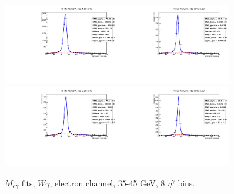 \begin{figure}[htb]
\begin{center}
   \includegraphics[width=0.45\textwidth]{../figs/figs_v11/ELECTRON_WGamma/EtoGammaFits/sa_hZmass_h_Data_EtoGamma_Enr_ENDCAP_pt35to45_ieta0.pdf}\includegraphics[width=0.45\textwidth]{../figs/figs_v11/ELECTRON_WGamma/EtoGammaFits/sa_hZmass_h_Data_EtoGamma_Enr_ENDCAP_pt35to45_ieta1.pdf}\\
   \includegraphics[width=0.45\textwidth]{../figs/figs_v11/ELECTRON_WGamma/EtoGammaFits/sa_hZmass_h_Data_EtoGamma_Enr_ENDCAP_pt35to45_ieta2.pdf}\includegraphics[width=0.45\textwidth]{../figs/figs_v11/ELECTRON_WGamma/EtoGammaFits/sa_hZmass_h_Data_EtoGamma_Enr_ENDCAP_pt35to45_ieta3.pdf}\\
  \label{fig:etogFits_35to45}
  \caption{$M_{e\gamma}$ fits, $W\gamma$, electron channel, 35-45 GeV, 8 $\eta^{\gamma}$ bins.}
  \end{center}
\end{figure}

